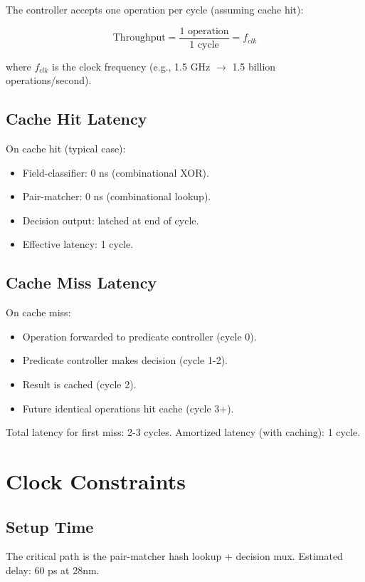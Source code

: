 \documentclass[11pt,oneside]{article}
\begin{document}
The controller accepts one operation per cycle (assuming cache hit):

\[
\text{Throughput} = \frac{1 \text{ operation}}{1 \text{ cycle}} = f_{clk}
\]

where $f_{clk}$ is the clock frequency (e.g., 1.5 GHz $\to$ 1.5 billion operations/second).

\subsection{Cache Hit Latency}

On cache hit (typical case):
\begin{itemize}
\item Field-classifier: 0 ns (combinational XOR).
\item Pair-matcher: 0 ns (combinational lookup).
\item Decision output: latched at end of cycle.
\item Effective latency: 1 cycle.
\end{itemize}

\subsection{Cache Miss Latency}

On cache miss:
\begin{itemize}
\item Operation forwarded to predicate controller (cycle 0).
\item Predicate controller makes decision (cycle 1-2).
\item Result is cached (cycle 2).
\item Future identical operations hit cache (cycle 3+).
\end{itemize}

Total latency for first miss: 2-3 cycles. Amortized latency (with caching): 1 cycle.

\section{Clock Constraints}

\subsection{Setup Time}

The critical path is the pair-matcher hash lookup + decision mux. Estimated delay: 60 ps at 28nm.
\end{document}
